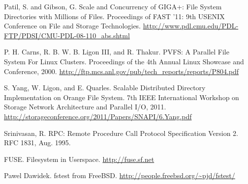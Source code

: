 \documentclass[onecolumn, 11pt, letterpaper]{article}
\begin{document}
\begin{thebibliography}{9}

    Patil, S. and Gibson, G. Scale and Concurrency of GIGA+: File System
    Directories with Millions of Files.
    Proceedings of FAST '11: 9th USENIX Conference on File and Storage
    Technologies.
    \url{http://www.pdl.cmu.edu/PDL-FTP/PDSI/CMU-PDL-08-110_abs.shtml}

    P. H. Carns, R. B. W. B. Ligon III, and R. Thakur. PVFS: A Parallel File
    System For Linux Clusters. Proceedings of the 4th Annual Linux Showcase
    and Conference, 2000.
    \url{http://ftp.mcs.anl.gov/pub/tech_reports/reports/P804.pdf}

    S. Yang, W. Ligon, and E. Quarles. Scalable Distributed Directory
    Implementation on Orange File System. 7th IEEE International Workshop on
    Storage Network Architecture and Parallel I/O, 2011.
    \url{http://storageconference.org/2011/Papers/SNAPI/6.Yang.pdf}

    Srinivasan, R. RPC: Remote Procedure Call Protocol Specification Version 2.
    RFC 1831, Aug. 1995.

    FUSE. Filesystem in Userspace. \url{http://fuse.sf.net}

  Pawel Dawidek.  fstest from FreeBSD.  \url{http://people.freebsd.org/~pjd/fstest/}

\end{thebibliography}
\end{document}
